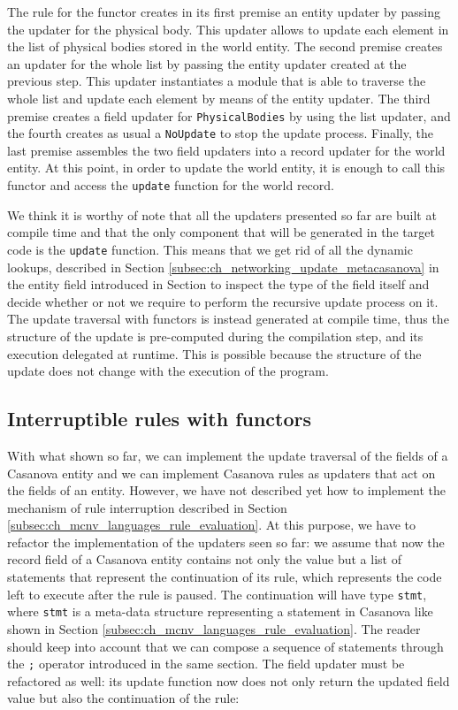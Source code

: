 \noindent
The rule for the functor creates in its first premise an entity updater by passing the updater for the physical body. This updater allows to update each element in the list of physical bodies stored in the world entity. The second premise creates an updater for the whole list by passing the entity updater created at the previous step. This updater instantiates a module that is able to traverse the whole list and update each element by means of the entity updater. The third premise creates a field updater for \texttt{PhysicalBodies} by using the list updater, and the fourth creates as usual a \texttt{NoUpdate} to stop the update process. Finally, the last premise assembles the two field updaters into a record updater for the world entity. At this point, in order to update the world entity, it is enough to call this functor and access the \texttt{update} function for the world record.

We think it is worthy of note that all the updaters presented so far are built at compile time and that the only component that will be generated in the target code is the \texttt{update} function. This means that we get rid of all the dynamic lookups, described in Section \ref{subsec:ch_networking_update_metacasanova} in the entity field introduced in Section  to inspect the type of the field itself and decide whether or not we require to perform the recursive update process on it. The update traversal with functors is instead generated at compile time, thus the structure of the update is pre-computed during the compilation step, and its execution delegated at runtime. This is possible because the structure of the update does not change with the execution of the program.

\subsection{Interruptible rules with functors}
\label{subsec:ch_networking_interruptible_rules}
With what shown so far, we can implement the update traversal of the fields of a Casanova entity and we can implement Casanova rules as updaters that act on the fields of an entity. However, we have not described yet how to implement the mechanism of rule interruption described in Section \ref{subsec:ch_mcnv_languages_rule_evaluation}. At this purpose, we have to refactor the implementation of the updaters seen so far: we assume that now the record field of a Casanova entity contains not only the value but a list of statements that represent the continuation of its rule, which represents the code left to execute after the rule is paused. The continuation will have type \texttt{stmt}, where \texttt{stmt} is a meta-data structure representing a statement in Casanova like shown in Section \ref{subsec:ch_mcnv_languages_rule_evaluation}. The reader should keep into account that we can compose a sequence of statements through the \texttt{;} operator introduced in the same section. The field updater must be refactored as well: its update function now does not only return the updated field value but also the continuation of the rule:

